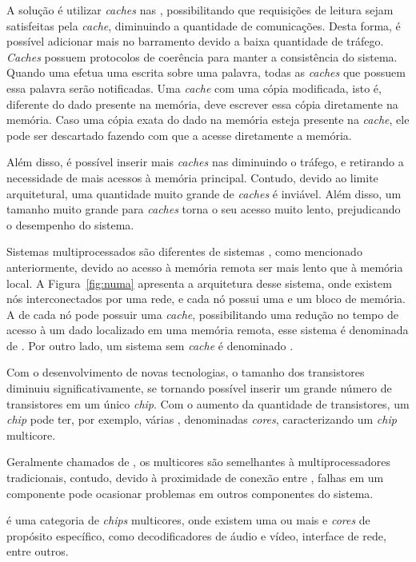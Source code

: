 A solução é utilizar \textit{caches} nas \cpus, possibilitando que requisições
de leitura sejam satisfeitas pela \textit{cache}, diminuindo a quantidade de
comunicações. Desta forma, é possível adicionar mais \cpus no barramento devido a baixa
quantidade de tráfego. \textit{Caches} possuem protocolos de coerência para
manter a consistência do sistema. Quando uma \cpu
efetua uma escrita sobre uma palavra, todas as \textit{caches} que possuem essa
palavra serão notificadas. Uma \textit{cache} com uma cópia modificada, isto é,
diferente do dado presente na memória, deve escrever essa cópia diretamente na
memória. Caso uma cópia exata do dado na memória esteja presente na
\textit{cache}, ele pode ser descartado fazendo com que a \cpu acesse
diretamente a memória.

Além disso, é possível inserir mais \textit{caches} nas \cpus
diminuindo o tráfego, e retirando a necessidade de mais acessos à memória
principal. Contudo, devido ao limite arquitetural, uma quantidade muito grande
de \textit{caches} é inviável. Além disso, um tamanho muito grande para
\textit{caches} torna o seu acesso muito lento, prejudicando o desempenho do
sistema.

Sistemas multiprocessados \numa são diferentes de sistemas \uma, como mencionado
anteriormente, devido ao acesso à memória remota ser mais lento que à memória
local. A Figura~\ref{fig:numa} apresenta a arquitetura desse sistema, onde
existem nós interconectados por uma rede, e cada nó possui uma \cpu e um bloco
de memória. A \cpu de cada nó pode possuir uma \textit{cache}, possibilitando
uma redução no tempo de acesso à um dado localizado em uma memória remota, esse
sistema é denominada de \ccnuma. Por outro lado, um sistema sem \textit{cache} é
denominado \ncnuma.

Com o desenvolvimento de novas tecnologias, o tamanho
dos transistores diminuiu significativamente, se tornando possível inserir um
grande número de transistores em um único \textit{chip}.
Com o aumento da quantidade de transistores, um \textit{chip} pode ter, por
exemplo, várias \cpus, denominadas \textit{cores}, caracterizando um
\textit{chip} multicore.

Geralmente chamados de \cmps, os multicores são semelhantes à multiprocessadores
tradicionais, contudo, devido à proximidade de conexão entre \cpus, falhas em um
componente pode ocasionar problemas em outros componentes do sistema.

\soc é uma categoria de \textit{chips} multicores, onde existem uma ou mais
\cpus e \textit{cores} de propósito específico, como decodificadores de áudio e
vídeo, interface de rede, entre outros.


